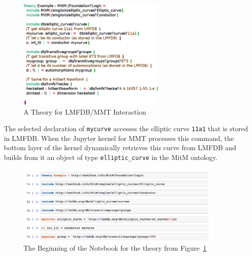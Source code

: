 \begin{figure}
  \includegraphics[width=0.65\textwidth]{../D4.11/hecke}\vspace*{-1em}
  \caption{A Theory for LMFDB/MMT Interaction}\label{fig:hecke}\vspace*{-2em}
\end{figure}
The selected declaration of \texttt{mycurve} accesses the elliptic curve \texttt{11a1} that is stored in LMFDB.
When the Jupyter kernel for MMT processes this command, the bottom layer of the kernel dynamically retrieves this curve from LMFDB and builds from it an object of type \texttt{elliptic\_curve} in the MitM ontology.\bigskip

\begin{figure}[ht]\centering
  \includegraphics[width=0.9\textwidth]{screenshots/heckenb}
  \caption{The Beginning of the Notebook for the theory from Figure~\ref{fig:hecke}}\label{fig:lmfdbexample}
\end{figure}


